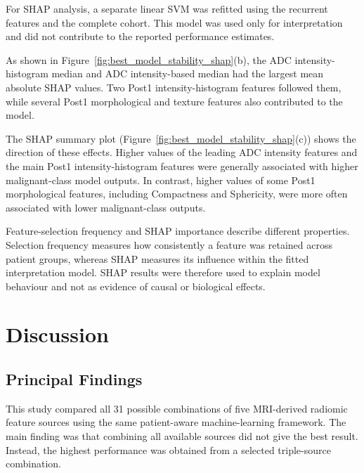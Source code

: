 \documentclass[12pt,twocolumn]{article}
\begin{document}
For SHAP analysis, a separate linear SVM was refitted using the
recurrent features and the complete cohort. This model was used only
for interpretation and did not contribute to the reported performance
estimates.

As shown in Figure~\ref{fig:best_model_stability_shap}(b), the ADC
intensity-histogram median and ADC intensity-based median had the
largest mean absolute SHAP values. Two Post1 intensity-histogram
features followed them, while several Post1 morphological and texture
features also contributed to the model.

The SHAP summary plot
(Figure~\ref{fig:best_model_stability_shap}(c)) shows the direction of
these effects. Higher values of the leading ADC intensity features and
the main Post1 intensity-histogram features were generally associated
with higher malignant-class model outputs. In contrast, higher values
of some Post1 morphological features, including Compactness and
Sphericity, were more often associated with lower malignant-class
outputs.

Feature-selection frequency and SHAP importance describe different
properties. Selection frequency measures how consistently a feature
was retained across patient groups, whereas SHAP measures its influence
within the fitted interpretation model. SHAP results were therefore
used to explain model behaviour and not as evidence of causal or
biological effects.



























\section{Discussion}
\label{sec:discussion}

\subsection{Principal Findings}
\label{subsec:discussion_principal_findings}

This study compared all 31 possible combinations of five MRI-derived
radiomic feature sources using the same patient-aware machine-learning
framework. The main finding was that combining all available sources
did not give the best result. Instead, the highest performance was
obtained from a selected triple-source combination.
\end{document}
